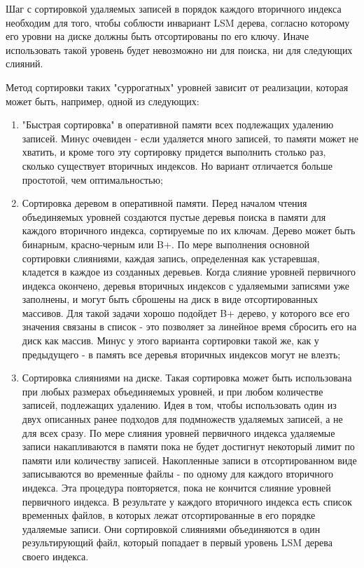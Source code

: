 \documentclass[a4paper,hidelinks,12pt]{article}
\begin{document}
Шаг с сортировкой удаляемых записей в порядок каждого вторичного индекса
необходим для того, чтобы соблюсти инвариант LSM дерева, согласно которому
его уровни на диске должны быть отсортированы по его ключу. Иначе использовать
такой уровень будет невозможно ни для поиска, ни для следующих слияний.

Метод сортировки таких "суррогатных" уровней зависит от реализации, которая
может быть, например, одной из следующих:
\begin{enumerate}
\item "Быстрая сортировка" в оперативной памяти всех подлежащих удалению
записей. Минус очевиден - если удаляется много записей, то памяти может не
хватить, и кроме того эту сортировку придется выполнить столько раз, сколько
существует вторичных индексов. Но вариант отличается больше простотой, чем
оптимальностью;
\item Сортировка деревом в оперативной памяти. Перед началом чтения объединяемых
уровней создаются пустые деревья поиска в памяти для каждого вторичного индекса,
сортируемые по их ключам. Дерево может быть бинарным, красно-черным или B+.
По мере выполнения основной сортировки слияниями, каждая запись, определенная
как устаревшая, кладется в каждое из созданных деревьев. Когда слияние уровней
первичного индекса окончено, деревья вторичных индексов с удаляемыми записями
уже заполнены, и могут быть сброшены на диск в виде отсортированных массивов.
Для такой задачи хорошо подойдет B+ дерево, у которого все его значения связаны
в список - это позволяет за линейное время сбросить его на диск как массив.
Минус у этого варианта сортировки такой же, как у предыдущего - в память все
деревья вторичных индексов могут не влезть;
\item Сортировка слияниями на диске. Такая сортировка может быть использована
при любых размерах объединяемых уровней, и при любом количестве записей,
подлежащих удалению. Идея в том, чтобы использовать один из двух описанных
ранее подходов для подмножеств удаляемых записей, а не для всех сразу. По мере
слияния уровней первичного индекса удаляемые записи накапливаются в памяти пока
не будет достигнут некоторый лимит по памяти или количеству записей. Накопленные
записи в отсортированном виде записываются во временные файлы - по одному для
каждого вторичного индекса. Эта процедура повторяется, пока не кончится слияние
уровней первичного индекса. В результате у каждого вторичного индекса есть
список временных файлов, в которых лежат отсортированные в его порядке удаляемые
записи. Они сортировкой слияниями объединяются в один результирующий файл,
который попадает в первый уровень LSM дерева своего индекса.
\end{enumerate}
\end{document}
